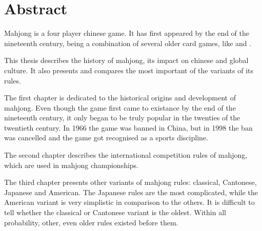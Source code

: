 \chapter*{Abstract}

Mahjong is a four player chinese game. It has first appeared by the end
of the nineteenth century, being a combination of several older card games, like
 and .

This thesis describes the history of mahjong, its impact on chinese and global
culture. It also presents and compares the most important of the variants of its
rules.

The first chapter is dedicated to the historical origins and development of
mahjong. Even though the game first came to existance by the end of the
nineteenth century, it only began to be truly popular in the twenties of the
twentieth century. In 1966 the game was banned in China, but in 1998 the ban was
cancelled and the game got recognised as a sports discipline.

The second chapter describes the international competition rules of mahjong,
which are used in mahjong championships.

The third chapter presents other variants of mahjong rules: classical,
Cantonese, Japanese and American. The Japanese rules are the most complicated,
while the American variant is very simplistic in comparison to the others. It is
difficult to tell whether the classical or Cantonese variant is the oldest.
Within all probability, other, even older rules existed before them.